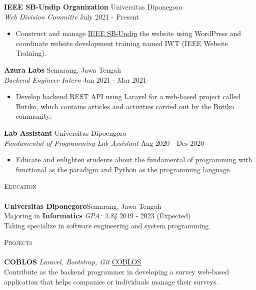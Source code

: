 \documentclass[a4paper]{article}
\newcommand{\lineunder} {
    \vspace*{-8pt} \\
    \hspace*{-18pt} \hrulefill \\
}
\newcommand{\header} [1] {
    {\hspace*{-18pt}\vspace*{6pt} \textsc{#1}}
    \vspace*{-6pt} \lineunder
}
\begin{document}
\textbf{IEEE SB-Undip Organization} \hfill Universitas Diponegoro\\
\textit{Web Division Committe} \hfill July 2021 - Present\\
\vspace{-1mm}
\begin{itemize} \itemsep 1pt
	\item Construct and manage \href{https://edu.ieee.org/id-undip/}{IEEE SB-Undip} the website using WordPress and coordinate website development training named IWT (IEEE Website Training).
\end{itemize}

\textbf{Azura Labs} \hfill Semarang, Jawa Tengah\\
\textit{Backend Engineer Intern} \hfill Jan 2021 - Mar 2021\\
\vspace{-1mm}
\begin{itemize} \itemsep 1pt
	\item Develop backend REST API using Laravel for a web-based project called \textquotesingle{}Butiko\textquotesingle{}, which contains articles and activities carried out by the \textquotesingle{}\href{https://butiko.id/}{Butiko}\textquotesingle{} community.
\end{itemize}

\textbf{Lab Assistant} \hfill Universitas Dipoengoro\\
\textit{Fundamental of Programming Lab Assistant} \hfill Aug 2020 - Des 2020\\
\vspace{-1mm}
\begin{itemize} \itemsep 1pt
	\item Educate and enlighten students about the fundamental of programming with functional as the paradigm and Python as the programming language.
\end{itemize}

\header{Education}
\textbf{Universitas Diponegoro}\hfill Semarang, Jawa Tengah\\
Majoring in \textbf{Informatics} \textit{GPA: 3.84} \hfill 2019 - 2023 (Expected)\\
Taking specialize in software engineering and system programming.
\vspace{2mm}

\header{Projects}
{\textbf{COBLOS}} {\sl Laravel, Bootstrap, Git} \hfill \href{https://coblos.herokuapp.com/}{COBLOS}\\
Contribute as the backend programmer in developing a survey web-based application that helps companies or individuals manage their surveys.\\
\vspace*{2mm}
\end{document}
